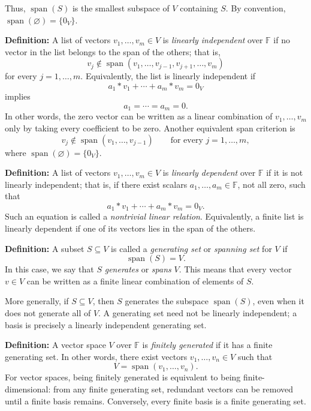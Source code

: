 \documentclass[a4paper,11pt,abstract=true]{scrartcl}
\theoremstyle{dotlessP}
\theoremstyle{dotlessS}
\theoremstyle{remark}
\theoremstyle{definition}
\begin{document}
Thus, $\operatorname{span}(S)$ is the smallest subspace of $V$ containing
$S$. By convention, $\operatorname{span}(\varnothing)=\{0_V\}$.

\begin{definition_box}
\textbf{Definition:} A list of vectors
$v_1,\ldots,v_m\in V$ is \emph{linearly independent} over $\mathbb{F}$ if no vector
in the list belongs to the span of the others; that is,
\[
v_j\notin\operatorname{span}(v_1,\ldots,v_{j-1},v_{j+1},\ldots,v_m)
\]
for every $j=1,\ldots,m$. Equivalently, the list is linearly independent if
\[
a_1*v_1+\cdots+a_m*v_m=0_V
\]
implies
\[
a_1=\cdots=a_m=0.
\]
In other words, the zero vector can be written as a linear combination of
$v_1,\ldots,v_m$ only by taking every coefficient to be zero. Another
equivalent span criterion is
\[
v_j\notin\operatorname{span}(v_1,\ldots,v_{j-1})
\qquad\text{for every }j=1,\ldots,m,
\]
where $\operatorname{span}(\varnothing)=\{0_V\}$.
\end{definition_box}

\begin{definition_box}
\textbf{Definition:} A list of vectors
$v_1,\ldots,v_m\in V$ is \emph{linearly dependent} over $\mathbb{F}$ if it is not
linearly independent; that is, if there exist scalars
$a_1,\ldots,a_m\in \mathbb{F}$, not all zero, such that
\[
a_1*v_1+\cdots+a_m*v_m=0_V.
\]
Such an equation is called a \emph{nontrivial linear relation}. Equivalently,
a finite list is linearly dependent if one of its vectors lies in the span of
the others.
\end{definition_box}


\textbf{Definition:} A subset $S\subseteq V$ is called a
\emph{generating set} or \emph{spanning set} for $V$ if
\[
\operatorname{span}(S)=V.
\]
In this case, we say that $S$ \emph{generates} or \emph{spans} $V$. This
means that every vector $v\in V$ can be written as a finite linear
combination of elements of $S$.

More generally, if $S\subseteq V$, then $S$ generates the subspace
$\operatorname{span}(S)$, even when it does not generate all of $V$. A
generating set need not be linearly independent; a basis is precisely a
linearly independent generating set.



\textbf{Definition:} A vector space $V$
over $\mathbb{F}$ is \emph{finitely generated} if it has a finite generating set. In
other words, there exist vectors $v_1,\ldots,v_n\in V$ such that
\[
V=\operatorname{span}(v_1,\ldots,v_n).
\]
For vector spaces, being finitely generated is equivalent to being
finite-dimensional: from any finite generating set, redundant vectors can be
removed until a finite basis remains. Conversely, every finite basis is a
finite generating set.
\end{document}
